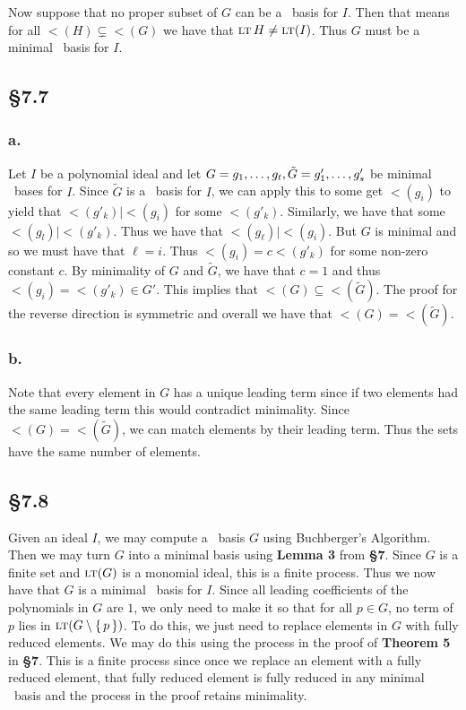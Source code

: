 \documentclass[letterpaper]{article}
\begin{document}
Now suppose that no proper subset of $G$ can be a \Grobner\ basis for $I$.
Then that means for all $\lt(H) \subsetneq \lt(G)$ we have that $\gen{\lt{H}} \neq \gen{\lt(I)}$.
Thus $G$ must be a minimal \Grobner\ basis for $I$.

\subsection*{\S 7.7}

\subsubsection*{a.}

Let $I$ be a polynomial ideal and let $G = \gen{g_{1}, \ldots, g_{t}}, \tilde{G} = \gen{g'_{1}, \ldots, g'_{s}}$ be minimal \Grobner\ bases for $I$.
Since $\tilde{G}$ is a \Grobner\ basis for $I$, we can apply this to some get $\lt(g_{i})$ to yield that $\lt(g'_{k}) \mid \lt(g_{i})$ for some $\lt(g'_{k})$.
Similarly, we have that some $\lt(g_{l}) \mid \lt(g'_{k})$.
Thus we have that $\lt(g_{\ell}) \mid \lt(g_{i})$.
But $G$ is minimal and so we must have that $\ell = i$.
Thus $\lt(g_{i}) = c \lt(g'_{k})$ for some non-zero constant $c$.
By minimality of $G$ and $\tilde{G}$, we have that $c = 1$ and thus $\lt(g_{i}) = \lt(g'_{k}) \in G'$.
This implies that $\lt(G) \subseteq \lt(\tilde{G})$.
The proof for the reverse direction is symmetric and overall we have that $\lt(G) = \lt(\tilde{G})$.

\subsubsection*{b.}

Note that every element in $G$ has a unique leading term since if two elements had the same leading term this would contradict minimality.
Since $\lt(G) = \lt(\tilde{G})$, we can match elements by their leading term.
Thus the sets have the same number of elements.

\subsection*{\S 7.8}

Given an ideal $I$, we may compute a \Grobner\ basis $G$ using Buchberger's Algorithm.
Then we may turn $G$ into a minimal basis using \textbf{Lemma 3} from \textbf{\S 7}.
Since $G$ is a finite set and $\gen{\lt(G)}$ is a monomial ideal, this is a finite process.
Thus we now have that $G$ is a minimal \Grobner\ basis for $I$.
Since all leading coefficients of the polynomials in $G$ are $1$, we only need to make it so that for all $p \in G$, no term of $p$ lies in $\gen{\lt(G \setminus \set{p})}$.
To do this, we just need to replace elements in $G$ with fully reduced elements.
We may do this using the process in the proof of \textbf{Theorem 5} in \textbf{\S 7}.
This is a finite process since once we replace an element with a fully reduced element, that fully reduced element is fully reduced in any minimal \Grobner\ basis and the process in the proof retains minimality.
\end{document}
